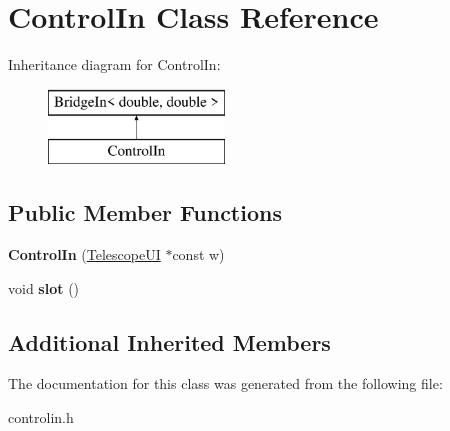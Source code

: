 \hypertarget{classControlIn}{}\section{Control\+In Class Reference}
\label{classControlIn}
Inheritance diagram for Control\+In\+:\begin{figure}[H]
\begin{center}
\leavevmode
\includegraphics[height=2.000000cm]{classControlIn}
\end{center}
\end{figure}
\subsection*{Public Member Functions}
\begin{DoxyCompactItemize}
\item 
\mbox{\label{classControlIn_aadc5715e6adde869b3887a6e12568364}} 
{\bfseries Control\+In} (\mbox{\hyperlink{classTelescopeUI}{Telescope\+UI}} $\ast$const w)
\item 
\mbox{\label{classControlIn_a4c412fb7e8009e94234487106fa605a5}} 
void {\bfseries slot} ()
\end{DoxyCompactItemize}
\subsection*{Additional Inherited Members}


The documentation for this class was generated from the following file\+:\begin{DoxyCompactItemize}
\item 
controlin.\+h\end{DoxyCompactItemize}
